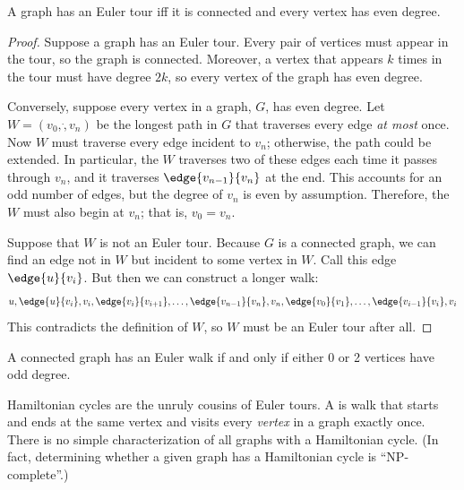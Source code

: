 \begin{theorem}
A graph has an Euler tour iff it is connected and every vertex has even
degree.
\end{theorem}

\begin{proof}
Suppose a graph has an Euler tour.  Every pair of vertices must appear in
the tour, so the graph is connected.  Moreover, a vertex that appears $k$
times in the tour must have degree $2k$, so every vertex of the graph has
even degree.


Conversely, suppose every vertex in a graph, $G$, has even degree.  Let $W
= (v_0,\dot,v_n)$ be the longest path in $G$ that traverses every edge
\textit{at most} once.  Now $W$ must traverse every edge incident to
$v_n$; otherwise, the path could be extended.  In particular, the $W$
traverses two of these edges each time it passes through $v_n$, and it
traverses $\edge{v_{n-1}}{v_n}$ at the end.  This accounts for an odd
number of edges, but the degree of $v_n$ is even by assumption.
Therefore, the $W$ must also begin at $v_n$; that is, $v_0 = v_n$.

Suppose that $W$ is not an Euler tour.  Because $G$ is a connected
graph, we can find an edge not in $W$ but incident to some vertex in
$W$.  Call this edge $\edge{u}{v_i}$.  But then we can construct a
longer walk:
%
\[
u, \edge{u}{v_i}, v_i, \edge{v_i}{v_{i+1}}, 
\dots, 
\edge{v_{n-1}}{v_n}, v_n, \edge{v_0}{v_1}, 
\dots, 
\edge{v_{i-1}}{v_i}, v_i
\]
%
This contradicts the definition of $W$, so $W$ must be an
Euler tour after all.
\end{proof}

\begin{corollary}
A connected graph has an Euler walk if and only if either 0 or 2
vertices have odd degree.
\end{corollary}

Hamiltonian cycles are the unruly cousins of Euler tours.  A
 is walk that starts and ends at the same vertex
and visits every \textit{vertex} in a graph exactly once.  There is no
simple characterization of all graphs with a Hamiltonian cycle.  (In fact,
determining whether a given graph has a Hamiltonian cycle is
``NP-complete''.)  \fi

\begin{problems}
\classproblems
{}

\homeworkproblems
{}

\end{problems}

